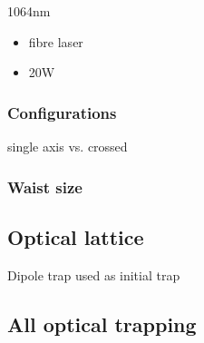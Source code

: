 1064nm
\begin{itemize}
    \item fibre laser
    \item 20W
\end{itemize}

\subsubsection{Configurations}
single axis vs. crossed

\subsubsection{Waist size}

\subsection{Optical lattice}
Dipole trap used as initial trap

\subsection{All optical trapping}
